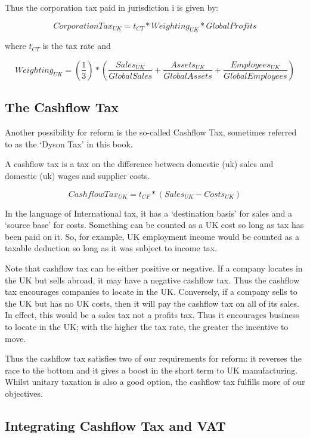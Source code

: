 \documentclass[]{tufte-handout}
\begin{document}
Thus the corporation tax paid in jurisdiction i is given by:

\[CorporationTax_{UK} = t_{CT} * Weighting_{UK} * Global Profits\]

where \(t_{CT}\) is the tax rate and

\[  Weighting_{UK} = \left( \frac{1}{3} \right)* \left( \frac{Sales_{UK}}{Global Sales} + \frac{Assets_{UK}}{Global Assets} + \frac{Employees_{UK}}{GlobalEmployees} \right)\]

\hypertarget{the-cashflow-tax}{%
\subsection{The Cashflow Tax}\label{the-cashflow-tax}}

Another possibility for reform is the so-called Cashflow Tax, sometimes
referred to as the `Dyson Tax' in this book.

A cashflow tax is a tax on the difference between domestic (uk) sales
and domestic (uk) wages and supplier costs.

\[Cashflow Tax_{UK} = t_{CF} * (Sales_{UK} - Costs_{UK})\]

In the language of International tax, it has a `destination basis' for
sales and a `source base' for costs. Something can be counted as a UK
cost so long as tax has been paid on it. So, for example, UK employment
income would be counted as a taxable deduction so long as it was subject
to income tax.

Note that cashflow tax can be either positive or negative. If a company
locates in the UK but sells abroad, it may have a negative cashflow tax.
Thus the cashflow tax encourages companies to locate in the UK.
Conversely, if a company sells to the UK but has no UK costs, then it
will pay the cashflow tax on all of its sales. In effect, this would be
a sales tax not a profits tax. Thus it encourages business to locate in
the UK; with the higher the tax rate, the greater the incentive to move.

Thus the cashflow tax satisfies two of our requirements for reform: it
reverses the race to the bottom and it gives a boost in the short term
to UK manufacturing. Whilst unitary taxation is also a good option, the
cashflow tax fulfills more of our objectives.

\hypertarget{integrating-cashflow-tax-and-vat}{%
\subsection{Integrating Cashflow Tax and
VAT}\label{integrating-cashflow-tax-and-vat}}
\end{document}
